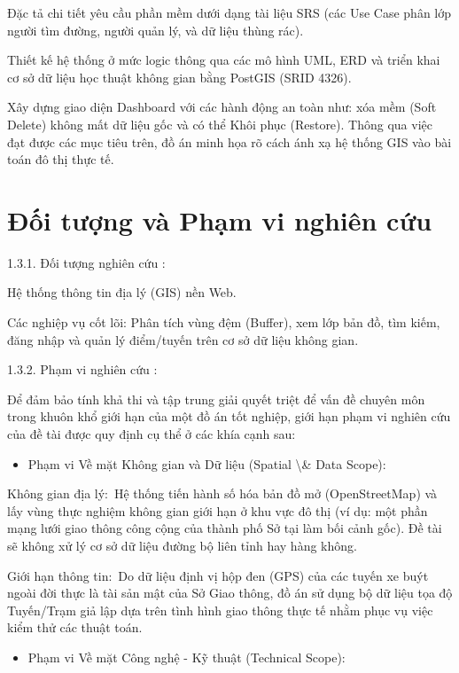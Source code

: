 \documentclass[13pt,a4paper]{report}
\begin{document}
Đặc tả chi tiết yêu cầu phần mềm dưới dạng tài liệu SRS (các Use Case phân lớp người tìm đường, người quản lý, và dữ liệu thùng rác).

Thiết kế hệ thống ở mức logic thông qua các mô hình UML, ERD và triển khai cơ sở dữ liệu học thuật không gian bằng PostGIS (SRID 4326).

Xây dựng giao diện Dashboard với các hành động an toàn như: xóa mềm (Soft Delete) không mất dữ liệu gốc và có thể Khôi phục (Restore). Thông qua việc đạt được các mục tiêu trên, đồ án minh họa rõ cách ánh xạ hệ thống GIS vào bài toán đô thị thực tế.

\section{Đối tượng và Phạm vi nghiên cứu}

1.3.1. Đối tượng nghiên cứu :

Hệ thống thông tin địa lý (GIS) nền Web.

Các nghiệp vụ cốt lõi: Phân tích vùng đệm (Buffer), xem lớp bản đồ, tìm kiếm, đăng nhập và quản lý điểm/tuyến trên cơ sở dữ liệu không gian.

1.3.2. Phạm vi nghiên cứu :

Để đảm bảo tính khả thi và tập trung giải quyết triệt để vấn đề chuyên môn trong khuôn khổ giới hạn của một đồ án tốt nghiệp, giới hạn phạm vi nghiên cứu của đề tài được quy định cụ thể ở các khía cạnh sau:

\begin{itemize}
    \item Phạm vi Về mặt Không gian và Dữ liệu (Spatial \textbackslash{}& Data Scope):
\end{itemize}

Không gian địa lý: Hệ thống tiến hành số hóa bản đồ mở (OpenStreetMap) và lấy vùng thực nghiệm không gian giới hạn ở khu vực đô thị (ví dụ: một phần mạng lưới giao thông công cộng của thành phố Sở tại làm bối cảnh gốc). Đề tài sẽ không xử lý cơ sở dữ liệu đường bộ liên tỉnh hay hàng không.

Giới hạn thông tin: Do dữ liệu định vị hộp đen (GPS) của các tuyến xe buýt ngoài đời thực là tài sản mật của Sở Giao thông, đồ án sử dụng bộ dữ liệu tọa độ Tuyến/Trạm giả lập dựa trên tình hình giao thông thực tế nhằm phục vụ việc kiểm thử các thuật toán.

\begin{itemize}
    \item Phạm vi Về mặt Công nghệ - Kỹ thuật (Technical Scope):
\end{itemize}
\end{document}
